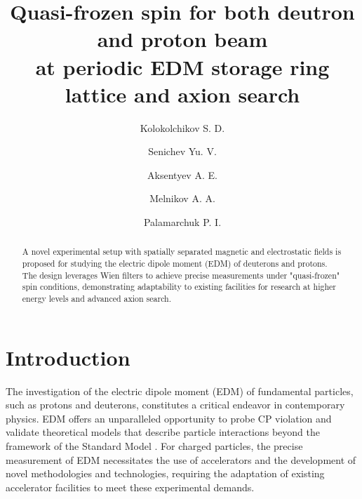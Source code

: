 \documentclass[submitting]{nst}
\begin{document}
\title{Quasi-frozen spin for both deutron and proton beam\\ at periodic EDM storage ring lattice and axion search}

\author{Kolokolchikov S. D.}

\author{Senichev Yu. V.}

\author{Aksentyev A. E.}

\author{Melnikov A. A.}

\author{Palamarchuk P. I.}

\begin{abstract}
A novel experimental setup with spatially separated magnetic and electrostatic fields is proposed for studying the electric dipole moment (EDM) of deuterons and protons. The design leverages Wien filters to achieve precise measurements under "quasi-frozen" spin conditions, demonstrating adaptability to existing facilities for research at higher energy levels and advanced axion search.
\end{abstract}


\maketitle

\section{Introduction}\label{sec.I}
\par The investigation of the electric dipole moment (EDM) of fundamental particles, such as protons and deuterons, constitutes a critical endeavor in contemporary physics. EDM offers an unparalleled opportunity to probe CP violation and validate theoretical models that describe particle interactions beyond the framework of the Standard Model \cite{EDM}. For charged particles, the precise measurement of EDM necessitates the use of accelerators and the development of novel methodologies and technologies, requiring the adaptation of existing accelerator facilities to meet these experimental demands.
\end{document}
